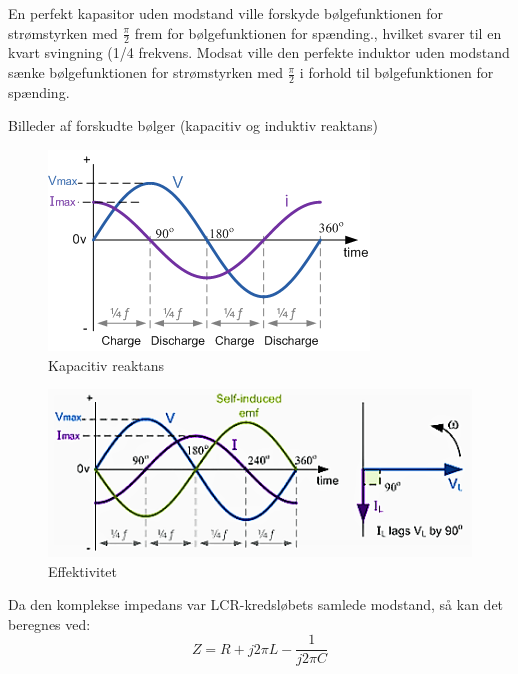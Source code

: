 En perfekt kapasitor uden modstand ville forskyde bølgefunktionen for strømstyrken med $\frac{\pi}{2}$ frem for bølgefunktionen for spænding., hvilket svarer til en kvart svingning (1/4 frekvens. Modsat ville den perfekte induktor uden modstand sænke bølgefunktionen for strømstyrken med $\frac{\pi}{2}$ i forhold til bølgefunktionen for spænding.

Billeder af forskudte bølger (kapacitiv og induktiv reaktans)
\begin{figure}[H]
\centering
\includegraphics[scale=1]{Kapacitiv_reaktans}
\caption{Kapacitiv reaktans}
\label{effektivitet}
\end{figure}

\begin{figure}[H]
\centering
\includegraphics[scale=0.8]{Induktiv_reaktans}
\caption{Effektivitet}
\label{effektivitet}
\end{figure}

Da den komplekse impedans var LCR-kredsløbets samlede modstand, så kan det beregnes ved:
\begin{equation}
Z = R + j 2 \pi L - \frac{1}{j 2 \pi C}
\end{equation}
